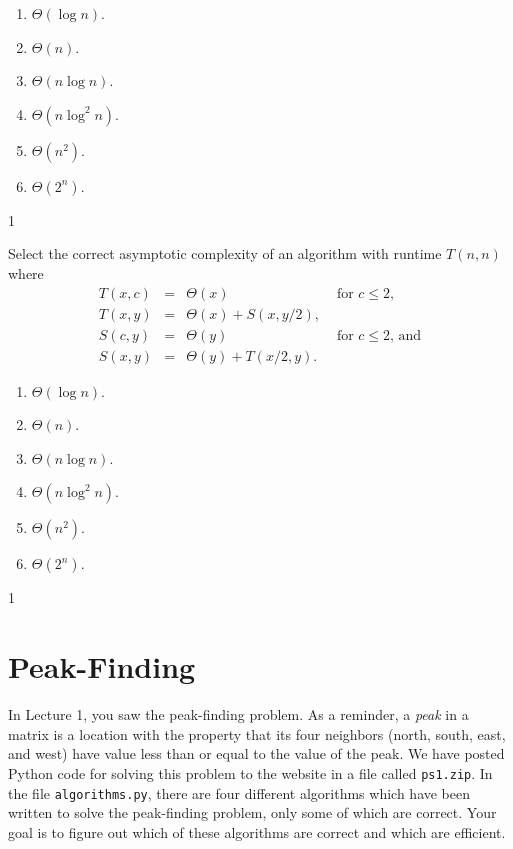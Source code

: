 \documentclass[12pt,twoside]{article}
\begin{document}
\begin{exercises}
\begin{exerciseparts}
\begin{enumerate}
\item $\Theta(\log n)$.
\item $\Theta(n)$.
\item $\Theta(n \log n)$.
\item $\Theta(n \log^2 n)$.
\item $\Theta(n^2)$.
\item $\Theta(2^n)$.
\end{enumerate}

\ifsolution \solution{}
1
\fi

\problempart {}
Select the correct asymptotic complexity
of an algorithm with runtime $T(n, n)$
where 
$$
\begin{array}{rcll}
T(x, c) &=& \Theta(x) & \textrm{ for $c \le 2$}, \\
T(x, y) &=& \Theta(x) + S(x, y / 2), \\
S(c, y) &=& \Theta(y) & \textrm{ for $c \le 2$, and} \\
S(x, y) &=& \Theta(y) + T(x / 2, y).
\end{array}
$$

\begin{enumerate}
\item $\Theta(\log n)$.
\item $\Theta(n)$.
\item $\Theta(n \log n)$.
\item $\Theta(n \log^2 n)$.
\item $\Theta(n^2)$.
\item $\Theta(2^n)$.
\end{enumerate}

\ifsolution \solution{}
1
\fi

\end{exerciseparts}

\section*{Peak-Finding}

In Lecture 1,
you saw the peak-finding problem.
As a reminder,
a \emph{peak} in a matrix
is a location with the property that its four neighbors
(north, south, east, and west)
have value less than or equal to the value of the peak.
We have posted Python code for solving this problem
to the website in a file called \texttt{ps1.zip}.
In the file \texttt{algorithms.py},
there are four different algorithms
which have been written
to solve the peak-finding problem,
only some of which are correct.
Your goal is to figure out
which of these algorithms are correct
and which are efficient.


\end{exercises}
\end{document}
